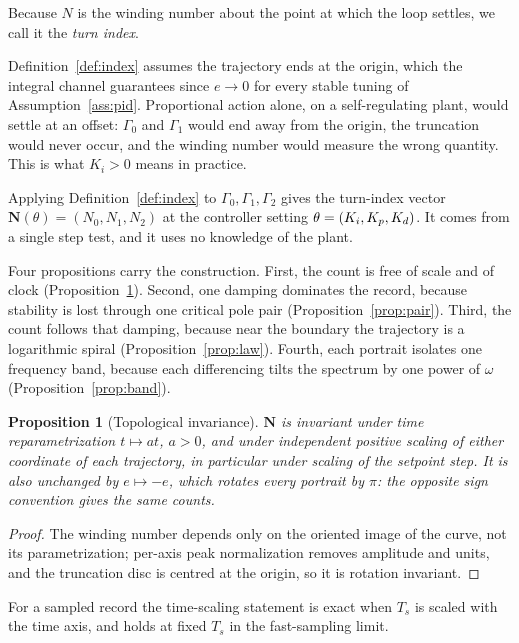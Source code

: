 \documentclass[final,3p,times,twocolumn]{elsarticle}
\newcommand{\new}[1]{\textcolor{black}{#1}}  %
\newtheorem{proposition}{Proposition}
\begin{document}
Because $N$ is the winding number about the point at which the loop
settles, we call it the \emph{turn index}.

Definition~\ref{def:index} assumes the trajectory ends at the origin,
which the integral channel guarantees since $e \to 0$ for every stable
tuning of Assumption~\ref{ass:pid}. Proportional action alone, on a
self-regulating plant, would settle at an offset: $\Gamma_0$ and
$\Gamma_1$ would end away from the origin, the truncation would never
occur, and the winding number would measure the wrong quantity. This is
what $K_i > 0$ means in practice.

Applying Definition~\ref{def:index} to $\Gamma_0, \Gamma_1, \Gamma_2$
gives the turn-index vector $\mathbf N(\theta) = (N_0, N_1, N_2)$ at the
controller setting $\theta = \new{(K_i, K_p, K_d)}$. It comes from a
single step test, and it uses no knowledge of the plant.

Four propositions carry the construction. First, the count is free of
scale and of clock (Proposition~\ref{prop:invariance}). Second, one
damping dominates the record, because stability is lost through one
critical pole pair (Proposition~\ref{prop:pair}). Third, the count
follows that damping, because near the boundary the trajectory is a
logarithmic spiral (Proposition~\ref{prop:law}). Fourth, each portrait
isolates one frequency band, because each differencing tilts the
spectrum by one power of $\omega$ (Proposition~\ref{prop:band}).

\begin{proposition}[Topological invariance]\label{prop:invariance}
$\mathbf N$ is invariant under time reparametrization $t \mapsto a t$,
$a > 0$, and under independent positive scaling of either coordinate of
each trajectory, in particular under scaling of the setpoint step. It is
also unchanged by $e \mapsto -e$, which rotates every portrait by $\pi$:
the opposite sign convention gives the same counts.
\end{proposition}

\begin{proof}
The winding number depends only on the oriented image of the curve, not
its parametrization; per-axis peak normalization removes amplitude and
units, and the truncation disc is centred at the origin, so it is
rotation invariant.
\end{proof}

For a sampled record the time-scaling statement is exact when $T_s$ is
scaled with the time axis, and holds at fixed $T_s$ in the
fast-sampling limit.
\end{document}
